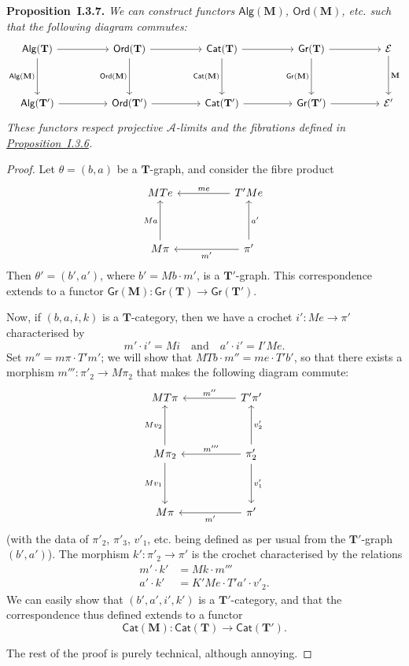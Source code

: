 \documentclass[fleqn]{article}
\newenvironment{itenv}[1]
  {\phantomsection\par\medskip\noindent\textbf{#1.}\itshape}
  {\par\medskip}
\newcommand{\oldpage}[1]{\marginpar{\footnotesize$\Big\vert$ \textit{p.~#1}}}
\newcommand{\TT}{\mathbf{T}}
\newcommand{\MM}{\mathbf{M}}
\newcommand{\textand}{\quad\text{and}\quad}
\newcommand{\cat}[1]{\mathcal{#1}}
\newcommand{\Cat}[1]{\mathsf{#1}}
\newcommand{\Gr}[1]{\Cat{Gr}(#1)}
\newcommand{\Alg}[1]{\Cat{Alg}(#1)}
\newcommand{\Ord}[1]{\Cat{Ord}(#1)}
\begin{document}
\oldpage{237}
\begin{itenv}{Proposition~I.3.7}
  We can construct functors $\Alg{\MM}$, $\Ord{\MM}$, etc. such that the following diagram commutes:
  \[
    \begin{tikzcd}[sep=huge]
      \Alg{\TT}
        \ar[d,swap,"\Alg{\MM}"]
        \ar[r]
    & \Ord{\TT}
        \ar[d,swap,"\Ord{\MM}"]
        \ar[r]
    & \Cat{Cat}(\TT)
        \ar[d,swap,"\Cat{Cat}(\MM)"]
        \ar[r]
    & \Gr{\TT}
        \ar[d,swap,"\Gr{\MM}"]
        \ar[r]
    & \cat{E}
        \ar[d,"\MM"]
    \\\Alg{\TT'}
        \ar[r]
    & \Ord{\TT'}
        \ar[r]
    & \Cat{Cat}(\TT')
        \ar[r]
    & \Gr{\TT'}
        \ar[r]
    & \cat{E'}
    \end{tikzcd}
  \]
  These functors respect projective $\cat{A}$-limits and the fibrations defined in \hyperref[proposition:i.3.6]{Proposition~I.3.6}.
\end{itenv}

\begin{proof}
  Let $\theta=(b,a)$ be a $\TT$-graph, and consider the fibre product
  \[
    \begin{tikzcd}[sep=huge]
      MTe
    & T'Me
        \ar[l,swap,"me"]
    \\M\pi
        \ar[u,"Ma"]
    & \pi'
        \ar[l,"m'"]
        \ar[u,swap,"a'"]
    \end{tikzcd}
  \]
  Then $\theta'=(b',a')$, where $b'=Mb\cdot m'$, is a $\TT'$-graph.
  This correspondence extends to a functor $\Gr{\MM}\colon\Gr{\TT}\to\Gr{\TT'}$.

  Now, if $(b,a,i,k)$ is a $\TT$-category, then we have a crochet $i'\colon Me\to\pi'$ characterised by
  \[
    m'\cdot i' = Mi
    \textand
    a'\cdot i' = I'Me.
  \]
  Set $m''=m\pi\cdot T'm'$;
  we will show that $MTb\cdot m''=me\cdot T'b'$, so that there exists a morphism $m'''\colon\pi'_2\to M\pi_2$ that makes the following diagram commute:
  \[
    \begin{tikzcd}[sep=huge]
      MT\pi
    & T'\pi'
        \ar[l,swap,"m''"]
    \\M\pi_2
        \ar[u,"Mv_2"]
        \ar[d,swap,"Mv_1"]
    & \pi'_2
        \ar[u,swap,"v'_2"]
        \ar[l,swap,"m'''"]
        \ar[d,"v'_1"]
    \\M\pi
    & \pi'
        \ar[l,"m'"]
    \end{tikzcd}
  \]
  (with the data of $\pi'_2$, $\pi'_3$, $v'_1$, etc. being defined as per usual from the $\TT'$-graph $(b',a')$).
  The morphism $k'\colon\pi'_2\to\pi'$ is the crochet characterised by the relations
  \[
    \begin{aligned}
      m'\cdot k'
    & = Mk\cdot m'''
    \\a'\cdot k'
    & = K'Me\cdot T'a'\cdot v'_2.
    \end{aligned}
  \]
  \oldpage{238}
  We can easily show that $(b',a',i',k')$ is a $\TT'$-category, and that the correspondence thus defined extends to a functor
  \[
    \Cat{Cat}(\MM)\colon \Cat{Cat}(\TT)\to\Cat{Cat}(\TT').
  \]

  The rest of the proof is purely technical, although annoying.
\end{proof}
\end{document}
